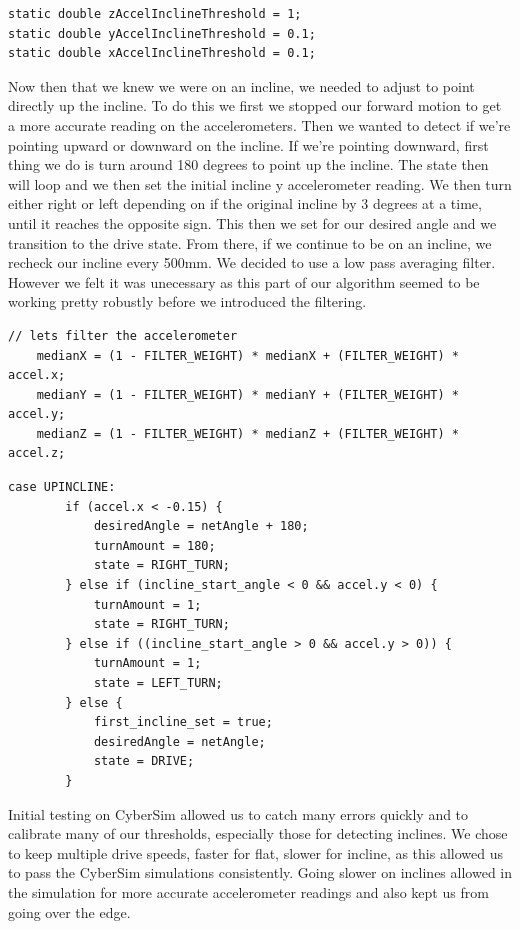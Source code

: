 \documentclass[twoside]{article}
\begin{document}
\vspace{-3mm}
\begin{lstlisting}[mathescape, frame=single]
static double zAccelInclineThreshold = 1;
static double yAccelInclineThreshold = 0.1;
static double xAccelInclineThreshold = 0.1;
\end{lstlisting}

\noindent Now then that we knew we were on an incline, we needed to adjust to point directly up the incline. To do this we first we stopped our forward motion to get a more accurate reading on the accelerometers. Then we wanted to detect if we're pointing upward or downward on the incline. If we're pointing downward, first thing we do is turn around 180 degrees to point up the incline. The state then will loop and we then set the initial incline y accelerometer reading. We then turn either right or left depending on if the original incline by 3 degrees at a time, until it reaches the opposite sign. This then we set for our desired angle and we transition to the drive state. From there, if we continue to be on an incline, we recheck our incline every 500mm. We decided to use a low pass averaging filter. However we felt it was unecessary as this part of our algorithm seemed to be working pretty robustly before we introduced the filtering.

\vspace{3mm}
\begin{lstlisting}[mathescape, frame=single]
// lets filter the accelerometer
    medianX = (1 - FILTER_WEIGHT) * medianX + (FILTER_WEIGHT) * accel.x;
    medianY = (1 - FILTER_WEIGHT) * medianY + (FILTER_WEIGHT) * accel.y;
    medianZ = (1 - FILTER_WEIGHT) * medianZ + (FILTER_WEIGHT) * accel.z;
\end{lstlisting}

\vspace{3mm}
\begin{lstlisting}[mathescape, frame=single]
case UPINCLINE: 
		if (accel.x < -0.15) {
			desiredAngle = netAngle + 180;
			turnAmount = 180;
			state = RIGHT_TURN;
		} else if (incline_start_angle < 0 && accel.y < 0) {
			turnAmount = 1;
			state = RIGHT_TURN;
		} else if ((incline_start_angle > 0 && accel.y > 0)) {
			turnAmount = 1;
			state = LEFT_TURN;
		} else {
			first_incline_set = true;
			desiredAngle = netAngle;
			state = DRIVE;
		}
\end{lstlisting}

\noindent Initial testing on CyberSim allowed us to catch many errors quickly and to calibrate many of our thresholds, especially those for detecting inclines. We chose to keep multiple drive speeds, faster for flat, slower for incline, as this allowed us to pass the CyberSim simulations consistently. Going slower on inclines allowed in the simulation for more accurate accelerometer readings and also kept us from going over the edge.\\
\end{document}
